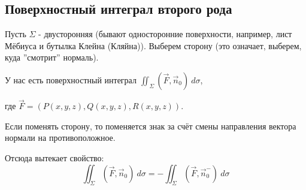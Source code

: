 \documentclass[12pt]{article}
\begin{document}
\subsection{Поверхностный интеграл второго рода}
Пусть $\Sigma$ - двусторонняя (бывают односторонние поверхности, например, лист Мёбиуса и бутылка Клейна (Кляйна)). Выберем сторону (это означает, выберем, куда ''смотрит'' нормаль).\par
У нас есть поверхностный интеграл $\iint_\Sigma (\overrightarrow{F}, \overrightarrow{n}_0) \ d\sigma$, \par
где $\overrightarrow{F} = (P(x,y,z),Q(x,y,z),R(x,y,z))$.\par
Если поменять сторону, то поменяется знак за счёт смены направления вектора нормали на противоположное.\par
Отсюда вытекает свойство:
$$\iint_\Sigma (\overrightarrow{F}, \overrightarrow{n}_0) \ d\sigma = -\iint_\Sigma (\overrightarrow{F}, \overrightarrow{n}_0^{-}) \ d\sigma$$
\end{document}

